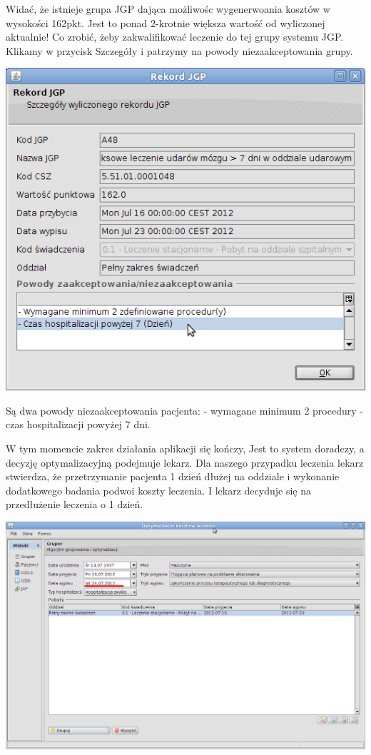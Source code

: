 Widać, że istnieje grupa JGP dająca możliwośc wygenerwoania kosztów w wysokości 162pkt. Jest to ponad 2-krotnie większa wartość od wyliczonej aktualnie! Co zrobić, żeby zakwalifikować leczenie do tej grupy systemu JGP. Klikamy w przycisk Szczegóły i patrzymy na powody niezaakceptowania grupy.

\includegraphics[scale=0.4]{images/gruper11}

Są dwa powody niezaakceptowania pacjenta:
- wymagane minimum 2 procedury
- czas hospitalizacji powyżej 7 dni.

W tym momencie zakres działania aplikacji się kończy, Jest to system doradczy, a decyzję optymalizacyjną podejmuje lekarz. Dla naszego przypadku leczenia lekarz stwierdza, że przetrzymanie pacjenta 1 dzień dłużej na oddziale i wykonanie dodatkowego badania podwoi koszty leczenia. I lekarz decyduje się na przedłużenie leczenia o 1 dzień.

\includegraphics[scale=0.4]{images/gruper12}

